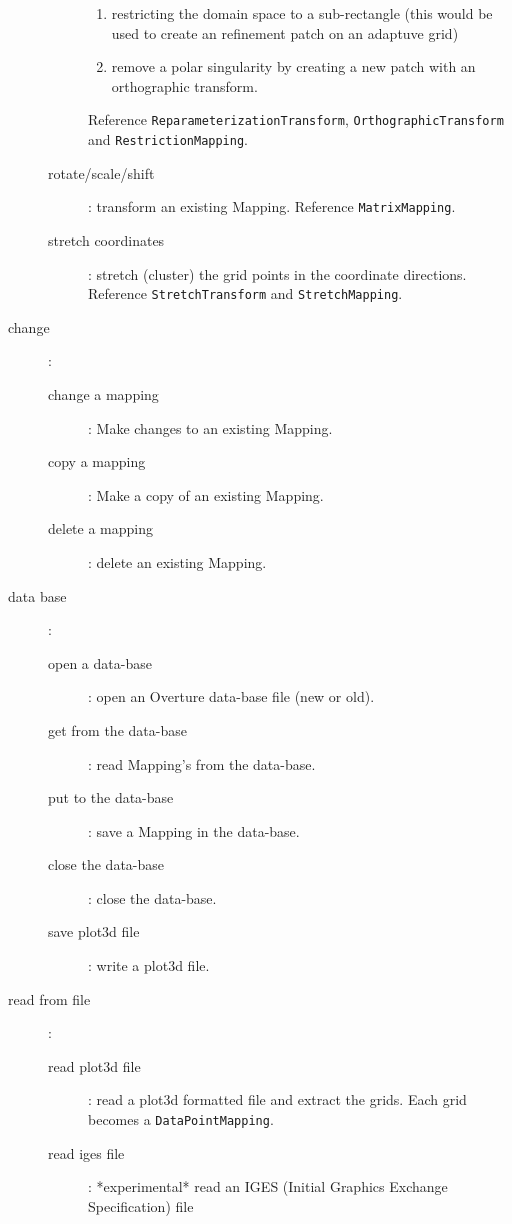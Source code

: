 \documentclass[xcolor=rgb,svgnames,dvipsnames]{article}
\begin{document}
\begin{description}
\begin{description}
      \begin{enumerate}
       \item restricting the domain space to a sub-rectangle (this would be used to create an refinement patch 
         on an adaptuve grid) 
       \item remove a polar singularity by creating a new patch with an orthographic transform.
      \end{enumerate}
        Reference {\tt Reparameterization\-Transform}, {\tt Orthographic\-Transform} and
                      {\tt Restriction\-Mapping}.
    \item[rotate/scale/shift] : transform an existing Mapping. Reference {\tt MatrixMapping}.
    \item[stretch coordinates] : stretch (cluster) the grid points in the coordinate directions.
         Reference {\tt Stretch\-Transform} and {\tt Stretch\-Mapping}. 
  \end{description}
  \item[change] :
  \begin{description}
    \item[change a mapping] : Make changes to an existing Mapping.
    \item[copy a mapping] : Make a copy of an existing Mapping.
    \item[delete a mapping] : delete an existing Mapping.
  \end{description}
  \item[data base] :
  \begin{description}
    \item[open a data-base] : open an Overture data-base file (new or old).
    \item[get from the data-base] : read Mapping's from the data-base.
    \item[put to the data-base] : save a Mapping in the data-base.
    \item[close the data-base] : close the data-base.
    \item[save plot3d file] : write a plot3d file.
  \end{description}
   \item[read from file] :
  \begin{description}
    \item[read plot3d file] : read a plot3d formatted file and extract the grids. Each grid becomes a
         {\tt DataPointMapping}.
    \item[read iges file] : *experimental* read an IGES (Initial Graphics Exchange Specification) file

\end{description}
\end{description}
\end{document}
